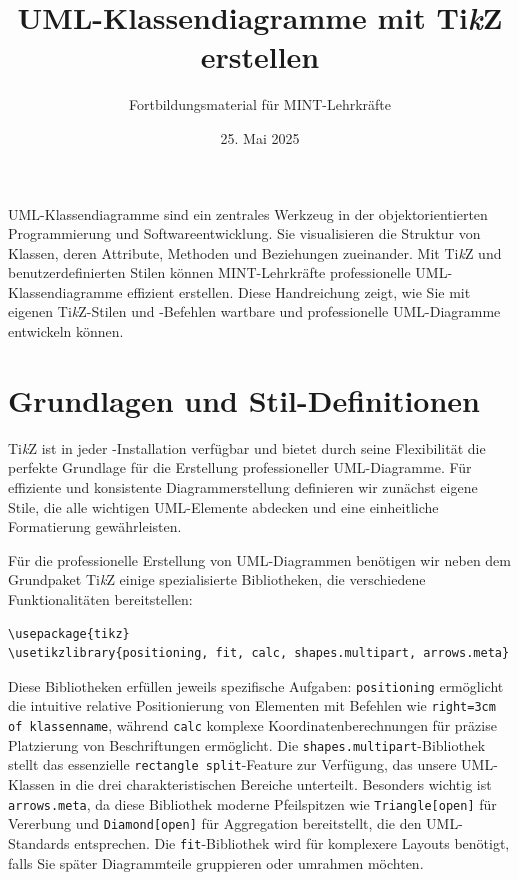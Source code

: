 



\title{UML-Klassendiagramme mit Ti\textit{k}Z erstellen}
\author{Fortbildungsmaterial für MINT-Lehrkräfte}
\date{25. Mai 2025}
\pagestyle{plain}



\maketitle

UML-Klassendiagramme sind ein zentrales Werkzeug in der objektorientierten Programmierung und Softwareentwicklung. Sie visualisieren die Struktur von Klassen, deren Attribute, Methoden und Beziehungen zueinander. Mit Ti\textit{k}Z und benutzerdefinierten Stilen können MINT-Lehrkräfte professionelle UML-Klassendiagramme effizient erstellen. Diese Handreichung zeigt, wie Sie mit eigenen Ti\textit{k}Z-Stilen und -Befehlen wartbare und professionelle UML-Diagramme entwickeln können.



\section{Grundlagen und Stil-Definitionen}

Ti\textit{k}Z ist in jeder -Installation verfügbar und bietet durch seine Flexibilität die perfekte Grundlage für die Erstellung professioneller UML-Diagramme. Für effiziente und konsistente Diagrammerstellung definieren wir zunächst eigene Stile, die alle wichtigen UML-Elemente abdecken und eine einheitliche Formatierung gewährleisten.

Für die professionelle Erstellung von UML-Diagrammen benötigen wir neben dem Grundpaket Ti\textit{k}Z einige spezialisierte Bibliotheken, die verschiedene Funktionalitäten bereitstellen:

\begin{lstlisting}[style=latex]
\usepackage{tikz}
\usetikzlibrary{positioning, fit, calc, shapes.multipart, arrows.meta}
\end{lstlisting}

Diese Bibliotheken erfüllen jeweils spezifische Aufgaben: \texttt{positioning} ermöglicht die intuitive relative Positionierung von Elementen mit Befehlen wie \texttt{right=3cm of klassenname}, während \texttt{calc} komplexe Koordinatenberechnungen für präzise Platzierung von Beschriftungen ermöglicht. Die \texttt{shapes.multipart}-Bibliothek stellt das essenzielle \texttt{rectangle split}-Feature zur Verfügung, das unsere UML-Klassen in die drei charakteristischen Bereiche unterteilt. Besonders wichtig ist \texttt{arrows.meta}, da diese Bibliothek moderne Pfeilspitzen wie \texttt{Triangle[open]} für Vererbung und \texttt{Diamond[open]} für Aggregation bereitstellt, die den UML-Standards entsprechen. Die \texttt{fit}-Bibliothek wird für komplexere Layouts benötigt, falls Sie später Diagrammteile gruppieren oder umrahmen möchten.


